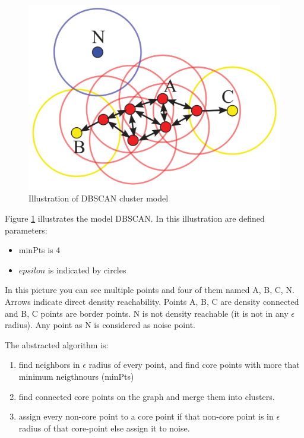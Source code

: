 	\begin{figure}[h]
		\centering
		\includegraphics[width=0.5\linewidth]{obrazky-figures/dbscan}
		\caption{Illustration of DBSCAN cluster model}
		\label{dbscan_ilustration}
	\end{figure}

	Figure \ref{dbscan_ilustration} illustrates the model DBSCAN.
	In this illustration are defined parameters:
	\begin{itemize}
			\item minPts is 4
			\item $epsilon$ is indicated by circles
	\end{itemize}

	In this picture you can see multiple points and four of them named A, B, C, N.
	Arrows indicate direct density reachability. Points A, B, C are density connected and B, C points are border points.
	N is not density reachable (it is not in any $\epsilon$ radius). Any point as N is considered as noise point.

	The abstracted algorithm is:\nopagebreak
	\begin{enumerate}
			\item find neighbors in $\epsilon$ radius of every point, and find core points with more that minimum neigthnours (minPts)
			\item find connected core points on the graph and merge them into clusters.
			\item assign every non-core point to a core point if that non-core point is in $\epsilon$ radius of that core-point else assign it to noise.
	\end{enumerate}

